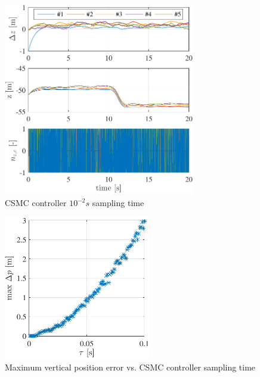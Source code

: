 \documentclass{ifacconf}
\begin{document}
\begin{figure}
\begin{center}
\includegraphics[width=8.4cm]{STSMC-100Hz-TIMESCALESEPARATION-turbulence=1}    %
\caption{ CSMC controller $10^{-2} s$ sampling time}
\label{fig:CSMC100Hz}
\end{center}
\end{figure}

\begin{figure}
\begin{center}
\includegraphics[width=6.4cm]{stsmc-maxerror-z-samplingtime}    %
\caption{Maximum vertical position error vs. CSMC controller sampling time}
\label{fig:bifurcation}
\end{center}
\end{figure}

\end{document}
